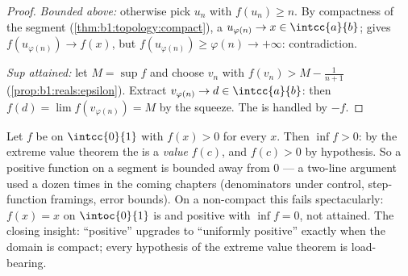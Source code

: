 \begin{proof}
\emph{Bounded above:} otherwise pick $u_n$ with $f(u_n) \geq n$. By
compactness of the segment (\cref{thm:b1:topology:compact}), a
 $u_{\varphi(n)} \to x \in \intcc{a}{b}$;  gives
$f(u_{\varphi(n)}) \to f(x)$, but $f(u_{\varphi(n)}) \geq \varphi(n)
\to +\infty$: contradiction.

\emph{Sup attained:} let $M = \sup f$ and choose $v_n$ with $f(v_n) >
M - \frac{1}{n+1}$ (\cref{prop:b1:reals:epsilon}). Extract
$v_{\varphi(n)} \to d \in \intcc{a}{b}$: then $f(d) = \lim
f(v_{\varphi(n)}) = M$ by the squeeze. The  is handled by
$-f$.
\end{proof}

\begin{example}\label{ex:b1:continuity:posmin}
Let $f$ be  on $\intcc{0}{1}$ with $f(x) > 0$ for
every $x$. Then $\inf f > 0$: by the extreme value theorem the
 is a \emph{value} $f(c)$, and $f(c) > 0$ by hypothesis.
So a  positive function on a segment is bounded away
from $0$ --- a two-line argument used a dozen times in the
coming chapters (denominators under control, step-function
framings, error bounds). On a non-compact  this fails
spectacularly: $f(x) = x$ on $\intoc{0}{1}$ is  and
positive with $\inf f = 0$, not attained. The closing insight:
``positive'' upgrades to ``uniformly positive'' exactly when the
domain is compact; every hypothesis of the extreme value theorem
is load-bearing.
\end{example}

